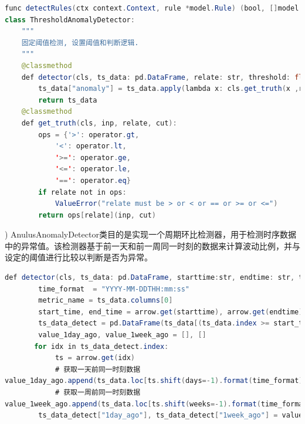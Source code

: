 \begin{longtable}[htbp]
\begin{lrbox}{\gudingyuzhi}  
\begin{lstlisting}[language=Java]  
func detectRules(ctx context.Context, rule *model.Rule) (bool, []model.RuleOutliers) {
class ThresholdAnomalyDetector:
    """
    固定阈值检测, 设置阈值和判断逻辑.
    """
    @classmethod
    def detector(cls, ts_data: pd.DataFrame, relate: str, threshold: float) -> pd.DataFrame:
        ts_data["anomaly"] = ts_data.apply(lambda x: cls.get_truth(x ,relate, threshold)).values
        return ts_data
    @classmethod
    def get_truth(cls, inp, relate, cut):
        ops = {'>': operator.gt,
            '<': operator.lt,
            '>=': operator.ge,
            '<=': operator.le,
            '==': operator.eq}
        if relate not in ops:
            ValueError("relate must be > or < or == or >= or <=")
        return ops[relate](inp, cut)
\end{lstlisting}  
\end{lrbox} 
\setlength{\belowcaptionskip}{-10pt} %
\begin{table}[h]   
\caption{固定阈值检测算法}  
\label{tab:gudingyuzhi}  
\usebox{\gudingyuzhi}  
\end{table} 

)	AnulusAnomalyDetector类目的是实现一个周期环比检测器，用于检测时序数据中的异常值。该检测器基于前一天和前一周同一时刻的数据来计算波动比例，并与设定的阈值进行比较以判断是否为异常。

\begin{lrbox}{\AnulusAnomalyDetectorOne}  
\begin{lstlisting}[language=Java]  
    def detector(cls, ts_data: pd.DataFrame, starttime:str, endtime: str, threshold_upper: float, threshold_lower: float) -> pd.DataFrame:
        time_format  = "YYYY-MM-DDTHH:mm:ss"
        metric_name = ts_data.columns[0]
        start_time, end_time = arrow.get(starttime), arrow.get(endtime)
        ts_data_detect = pd.DataFrame(ts_data[(ts_data.index >= start_time.format(time_format)) & (ts_data.index < end_time.format(time_format))])
        value_1day_ago, value_1week_ago = [], []
       for idx in ts_data_detect.index:
            ts = arrow.get(idx)
            # 获取一天前同一时刻数据
value_1day_ago.append(ts_data.loc[ts.shift(days=-1).format(time_format)].values[0])
            # 获取一周前同一时刻数据
value_1week_ago.append(ts_data.loc[ts.shift(weeks=-1).format(time_format)].values[0])
        ts_data_detect["1day_ago"], ts_data_detect["1week_ago"] = value_1day_ago, value_1week_ago


\end{lstlisting}
\end{lrbox}
\end{longtable}
